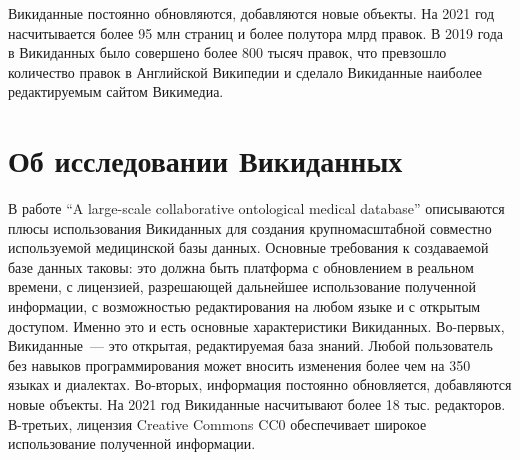Викиданные постоянно обновляются, добавляются новые объекты. На 2021 год насчитывается более 95 млн страниц и более полутора млрд правок\footnotemark.  В 2019 года в Викиданных было совершено более 800 тысяч правок, что превзошло количество правок в Английской Википедии и сделало Викиданные наиболее редактируемым сайтом Викимедиа\footnotemark. 

\section{Об исследовании Викиданных}

В работе ``A large-scale collaborative ontological medical database''\cite{Collaborative_ontological_database} 
описываются плюсы использования Викиданных для создания крупномасштабной 
совместно используемой медицинской базы данных. 
Основные требования к создаваемой базе данных таковы: 
это должна быть платформа с обновлением в реальном времени, 
с лицензией, разрешающей дальнейшее использование полученной информации, 
с возможностью редактирования на любом языке и с открытым доступом. 
Именно это и есть основные характеристики Викиданных. 
Во-первых, Викиданные~--- это открытая, редактируемая база знаний. 
Любой пользователь без навыков программирования может вносить изменения 
более чем на 350 языках и диалектах. 
Во-вторых, информация постоянно обновляется, добавляются новые объекты. 
На 2021 год Викиданные насчитывают более 18 тыс. редакторов\footnotemark. 
В-третьих, лицензия Creative Commons CC0 обеспечивает широкое использование полученной информации. 

